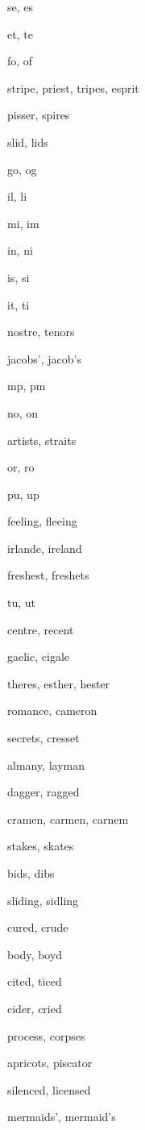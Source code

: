     \item se, es
    \item et, te
    \item fo, of
    \item stripe, priest, tripes, esprit
    \item pisser, spires
    \item slid, lids
    \item go, og
    \item il, li
    \item mi, im
    \item in, ni
    \item is, si
    \item it, ti
    \item nostre, tenors
    \item jacobs', jacob's
    \item mp, pm
    \item no, on
    \item artists, straits
    \item or, ro
    \item pu, up
    \item feeling, fleeing
    \item irlande, ireland
    \item freshest, freshets
    \item tu, ut
    \item centre, recent
    \item gaelic, cigale
    \item theres, esther, hester
    \item romance, cameron
    \item secrets, cresset
    \item almany, layman
    \item dagger, ragged
    \item cramen, carmen, carnem
    \item stakes, skates
    \item bids, dibs
    \item sliding, sidling
    \item cured, crude
    \item body, boyd
    \item cited, ticed
    \item cider, cried
    \item process, corpses
    \item apricots, piscator
    \item silenced, licensed
    \item mermaids', mermaid's
